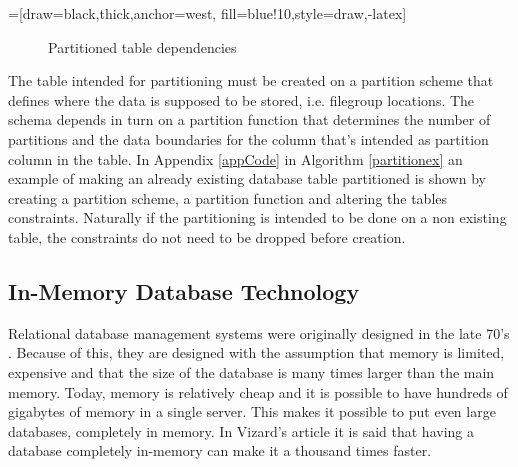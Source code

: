 \documentclass{cslthse-msc}
\begin{document}
=[draw=black,thick,anchor=west, fill=blue!10,style={draw,-latex}]
\begin{figure}[H]
\begin{center}
\end{center}
\caption {Partitioned table dependencies}
\label{partdep}
\end{figure}
The table intended for partitioning must be created on a partition scheme that defines where the data is supposed to be stored, i.e. filegroup locations. The schema depends in turn on a partition function that determines the number of partitions and the data boundaries for the column that's intended as partition column in the table.
In Appendix \ref{appCode} in Algorithm \ref{partitionex} \cite{partitonexample} an example of making an already existing database table partitioned is shown by creating a partition scheme, a partition function and altering the tables constraints. Naturally if the partitioning is intended to be done on a non existing table, the constraints do not need to be dropped before creation. 
 
\subsection{In-Memory Database Technology}
Relational database management systems were originally designed in the late 70's   \cite{Nevarez}. Because of this, they are designed with the assumption that memory is limited, expensive and that the size of the database is many times larger than the main memory. Today, memory is relatively cheap and it is possible to have hundreds of gigabytes of memory in a single server. This makes it possible to put even large databases, completely in memory. In Vizard's article   \cite{Vizard12} it is said that having a database completely in-memory can make it a thousand times faster.
\end{document}
